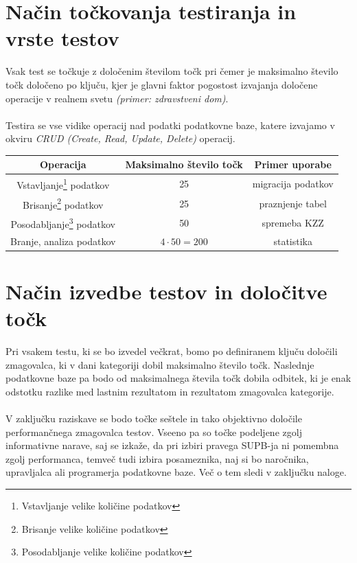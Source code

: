\documentclass[a4paper,11pt]{report}
\begin{document}
\section{Način točkovanja testiranja in vrste testov}

Vsak test se točkuje z določenim številom točk pri čemer je maksimalno število točk določeno po ključu, kjer je glavni faktor pogostost izvajanja določene operacije v realnem svetu \textit{(primer: zdravstveni dom)}.
\\\\
Testira se vse vidike operacij nad podatki podatkovne baze, katere izvajamo v okviru \textit{CRUD (Create, Read, Update, Delete)} operacij.

\begin{center}
   \begin{tabular}{||c|c|c||}
      \hline
      \textbf{Operacija} & \textbf{Maksimalno število točk} & \textbf{Primer uporabe}\\
      \hline
      \hline
      Vstavljanje\footnote{Vstavljanje velike količine podatkov} podatkov & 25 & migracija podatkov\\
      Brisanje\footnote{Brisanje velike količine podatkov} podatkov & 25 & praznjenje tabel\\
      Posodabljanje\footnote{Posodabljanje velike količine podatkov} podatkov & 50 & spremeba KZZ \\
      Branje, analiza podatkov & \(4 \cdot 50 = 200\) & statistika\\
      \hline
   \end{tabular}
\end{center}

\section{Način izvedbe testov in določitve točk}
Pri vsakem testu, ki se bo izvedel večkrat, bomo po definiranem ključu določili zmagovalca, ki v dani kategoriji dobil maksimalno število točk. Naslednje podatkovne baze pa bodo od maksimalnega števila točk dobila odbitek, ki je enak odstotku razlike med lastnim rezultatom in rezultatom zmagovalca kategorije. 
\\\\
V zaključku raziskave se bodo točke seštele in tako objektivno določile performančnega zmagovalca testov. Vseeno pa so točke podeljene zgolj informativne narave, saj se izkaže, da pri izbiri pravega SUPB-ja ni pomembna zgolj performanca, temveč tudi izbira posameznika, naj si bo naročnika, upravljalca ali programerja podatkovne baze. Več o tem sledi v zaključku naloge. 
\end{document}
